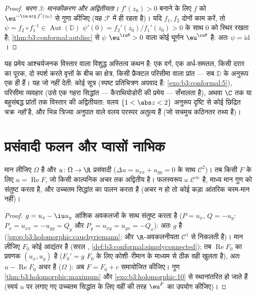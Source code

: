 \begin{proof}
\emph{चरण 3: मानकीकरण और अद्वितीयता।} $f'(z_0) > 0$ बनाने के लिए $f$ को
$\eu^{-\iu\arg f'(z_0)}$ से गुणा कीजिए (यह $\mathcal F$ में ही रहता है)। यदि $f_1, f_2$ दोनों
काम करें, तो $\psi =
f_2\circ f_1^{-1} \in \operatorname{Aut}(\mathbb D)$ $\psi'(0) = f_2'(z_0)/f_1'(z_0) > 0$ के साथ $0$ को स्थिर रखता है; \cref{thm:b3:conformal:autdisc} से
$\psi$ $\eu^{\iu\theta} > 0$ वाला कोई घूर्णन $\eu^{\iu\theta}$ है: अतः $\psi =
\mathrm{id}$।
\end{proof}

\begin{remark}\label{rem:b3:conformal:rmtscope}
यह प्रमेय आश्चर्यजनक विस्तार वाला विशुद्ध अस्तित्व कथन है: एक
वर्ग, एक अर्ध-समतल, किसी दरार का पूरक, दो स्पर्श करते वृत्तों के
बीच का क्षेत्र, किसी फ्रैक्टल परिसीमा वाला प्रांत --- सब $\mathbb D$ के
अनुरूप एक ही हैं। यह जो नहीं देती: कोई सूत्र (स्पष्ट प्रतिचित्रण
अपवाद हैं: \cref{exo:b3:conformal:5}), परिसीमा व्यवहार (उसे एक गहरा सिद्धांत ---
कैराथियोडोरी की प्रमेय --- सँभालता है), अथवा $\C$ तक या बहुसंबद्ध
प्रांतों तक विस्तार की अद्वितीयता: वलय $\{1 < \abs z < 2\}$ अनुरूप दृष्टि से
कोई छिद्रित चक्र \emph{नहीं} है, और भिन्न त्रिज्या अनुपात वाले
वलय परस्पर अतुल्य हैं (जो सचमुच कठिनतर तथ्य है)।
\end{remark}

\section{प्रसंवादी फलन और प्वासों नाभिक}

\begin{proposition}\label{prop:b3:conformal:harmonicholo}
मान लीजिए $\Omega$  है और $u \colon \Omega \to \R$
प्रसंवादी ($\Delta u = u_{xx} + u_{yy} = 0$ के साथ $\mathcal C^2$)। तब किसी
 $F$ के लिए $u =
\operatorname{Re}F$, जो किसी काल्पनिक अचर तक अद्वितीय
है। फलस्वरूप $u$ $\mathcal C^\infty$ है, माध्य मान गुण को संतुष्ट करता है, और
उच्चतम सिद्धांत का पालन करता है (अचर न हो तो कोई कड़ा आंतरिक
चरम-मान नहीं)।
\end{proposition}

\begin{proof}
$g = u_x - \iu u_y$  आंशिक अवकलजों के साथ  संतुष्ट करता है
($P = u_x$, $Q = -u_y$: $P_x = u_{xx} = -u_{yy} = Q_y$ और $P_y = u_{xy} = u_{yx} = -Q_x$): अतः $g$  है (\cref{prop:b3:holomorphic:cauchyriemann};
और $\R$-अवकलनीयता $\mathcal C^1$ से निकलती है)। मान लीजिए $F_0$ कोई
आद्यंतर है (सरल , \cref{def:b3:conformal:simplyconnected}); तब $\operatorname{Re}F_0$ का प्रवणक $(u_x, u_y)$ है
($F_0' = g$ $F_0$ के लिए कोशी--रीमान के माध्यम से ठीक वही खुलता है),
अतः $u - \operatorname{Re}F_0$ अचर है ($\Omega$ ): अब $F = F_0 + c$ समायोजित कीजिए। गुण
\cref{thm:b3:holomorphic:maximum} और \cref{exo:b3:holomorphic:10} से स्थानांतरित हो जाते हैं (स्वयं $u$ पर लगाए गए
उच्चतम सिद्धांत के लिए वहीं की तरह $\eu^{F}$ का उपयोग कीजिए)।
\end{proof}

